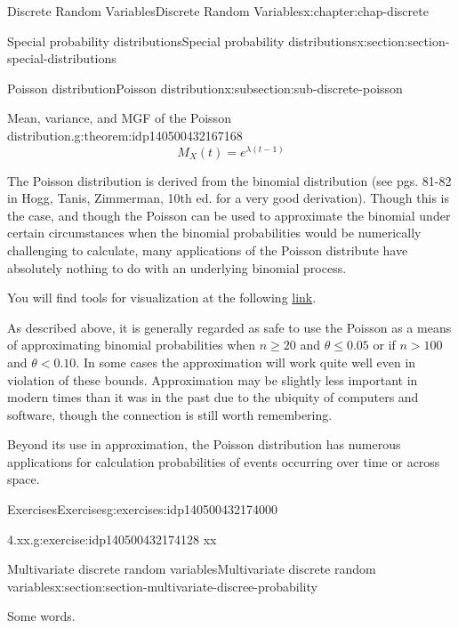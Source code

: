 \documentclass[oneside,10pt,]{book}
\newcommand{\lt}{<}
\newcommand{\gt}{>}
\begin{document}
\begin{chapterptx}{Discrete Random Variables}{}{Discrete Random Variables}{}{}{x:chapter:chap-discrete}
\begin{sectionptx}{Special probability distributions}{}{Special probability distributions}{}{}{x:section:section-special-distributions}
\begin{subsectionptx}{Poisson distribution}{}{Poisson distribution}{}{}{x:subsection:sub-discrete-poisson}
\begin{theorem}{Mean, variance, and MGF of the Poisson distribution.}{}{g:theorem:idp140500432167168}
\begin{equation*}
M_X(t)
= e^{\lambda(t-1)}
\end{equation*}
%
\end{theorem}
The Poisson distribution is derived from the binomial distribution (see pgs. 81-82 in Hogg, Tanis, Zimmerman, 10th ed. for a very good derivation).  Though this is the case, and though the Poisson can be used to approximate the binomial under certain circumstances when the binomial probabilities would be numerically challenging to calculate, many applications of the Poisson distribute have absolutely nothing to do with an underlying binomial process.%
\par
You will find tools for visualization at the following \href{https://buddy.uco.edu/shiny/slaverty/mathstat/BinPoi/}{link}.%
\par
As described above, it is generally regarded as safe to use the Poisson as a means of approximating binomial probabilities when \(n \ge
20\) and \(\theta \le 0.05\) or if \(n \gt 100\) and \(\theta
\lt 0.10\).  In some cases the approximation will work quite well even in violation of these bounds. Approximation may be slightly less important in modern times than it was in the past due to the ubiquity of computers and software, though the connection is still worth remembering.%
\par
Beyond its use in approximation, the Poisson distribution has numerous applications for calculation probabilities of events occurring over time or across space.%
\end{subsectionptx}
%
%
\typeout{************************************************}
\typeout{************************************************}
%
\begin{exercises-subsection}{Exercises}{}{Exercises}{}{}{g:exercises:idp140500432174000}
\begin{divisionexercise}{1}{4.xx.}{}{g:exercise:idp140500432174128}%
xx%
\end{divisionexercise}%
\end{exercises-subsection}
\end{sectionptx}
%
%
\typeout{************************************************}
\typeout{************************************************}
%
\begin{sectionptx}{Multivariate discrete random variables}{}{Multivariate discrete random variables}{}{}{x:section:section-multivariate-discree-probability}
\begin{introduction}{}%
Some words.%

\end{introduction}
\end{sectionptx}
\end{chapterptx}
\end{document}
